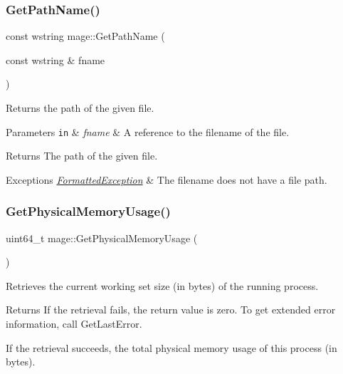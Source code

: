 \subsubsection{\texorpdfstring{Get\+Path\+Name()}{GetPathName()}\hspace{0.1cm}{\footnotesize\ttfamily [2/2]}}
{\footnotesize\ttfamily const wstring mage\+::\+Get\+Path\+Name (\begin{DoxyParamCaption}\item[{const wstring \&}]{fname }\end{DoxyParamCaption})}

Returns the path of the given file.


\begin{DoxyParams}[1]{Parameters}
\mbox{\tt in}  & {\em fname} & A reference to the filename of the file. \\
\hline
\end{DoxyParams}
\begin{DoxyReturn}{Returns}
The path of the given file. 
\end{DoxyReturn}

\begin{DoxyExceptions}{Exceptions}
{\em \hyperlink{structmage_1_1_formatted_exception}{Formatted\+Exception}} & The filename does not have a file path. \\
\hline
\end{DoxyExceptions}
\hypertarget{namespacemage_a2befb49b95dd9bdc634e28222cde9f46}{}\label{namespacemage_a2befb49b95dd9bdc634e28222cde9f46} 
\subsubsection{\texorpdfstring{Get\+Physical\+Memory\+Usage()}{GetPhysicalMemoryUsage()}}
{\footnotesize\ttfamily uint64\+\_\+t mage\+::\+Get\+Physical\+Memory\+Usage (\begin{DoxyParamCaption}{ }\end{DoxyParamCaption})\hspace{0.3cm}{\ttfamily [noexcept]}}

Retrieves the current working set size (in bytes) of the running process.

\begin{DoxyReturn}{Returns}
If the retrieval fails, the return value is zero. To get extended error information, call Get\+Last\+Error. 

If the retrieval succeeds, the total physical memory usage of this process (in bytes). 
\end{DoxyReturn}
\hypertarget{namespacemage_afbe0f2656d60d9909b98985f60022b3a}{}\label{namespacemage_afbe0f2656d60d9909b98985f60022b3a} 
